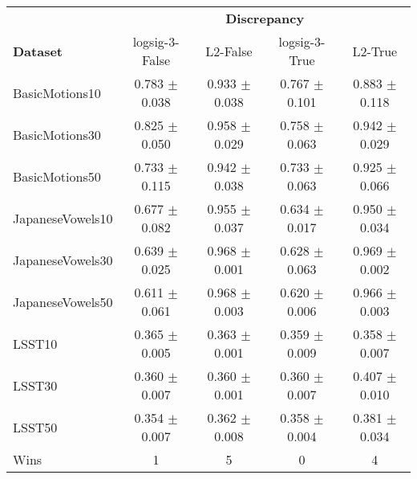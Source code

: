 \begin{tabular}{lcccc}
\toprule
{} & \multicolumn{4}{c}{\textbf{Discrepancy}} \\
\textbf{Dataset} &       logsig-3-False &           L2-False &      logsig-3-True &            L2-True \\
\midrule
BasicMotions10    &    0.783 $\pm$ 0.038 &  0.933 $\pm$ 0.038 &  0.767 $\pm$ 0.101 &  0.883 $\pm$ 0.118 \\
BasicMotions30    &    0.825 $\pm$ 0.050 &  0.958 $\pm$ 0.029 &  0.758 $\pm$ 0.063 &  0.942 $\pm$ 0.029 \\
BasicMotions50    &    0.733 $\pm$ 0.115 &  0.942 $\pm$ 0.038 &  0.733 $\pm$ 0.063 &  0.925 $\pm$ 0.066 \\
JapaneseVowels10  &    0.677 $\pm$ 0.082 &  0.955 $\pm$ 0.037 &  0.634 $\pm$ 0.017 &  0.950 $\pm$ 0.034 \\
JapaneseVowels30  &    0.639 $\pm$ 0.025 &  0.968 $\pm$ 0.001 &  0.628 $\pm$ 0.063 &  0.969 $\pm$ 0.002 \\
JapaneseVowels50  &    0.611 $\pm$ 0.061 &  0.968 $\pm$ 0.003 &  0.620 $\pm$ 0.006 &  0.966 $\pm$ 0.003 \\
LSST10            &    0.365 $\pm$ 0.005 &  0.363 $\pm$ 0.001 &  0.359 $\pm$ 0.009 &  0.358 $\pm$ 0.007 \\
LSST30            &    0.360 $\pm$ 0.007 &  0.360 $\pm$ 0.001 &  0.360 $\pm$ 0.007 &  0.407 $\pm$ 0.010 \\
LSST50            &    0.354 $\pm$ 0.007 &  0.362 $\pm$ 0.008 &  0.358 $\pm$ 0.004 &  0.381 $\pm$ 0.034 \\ 
\midrule
Wins &               1 &         5 &              0 &        4 \\
\bottomrule
\end{tabular}
